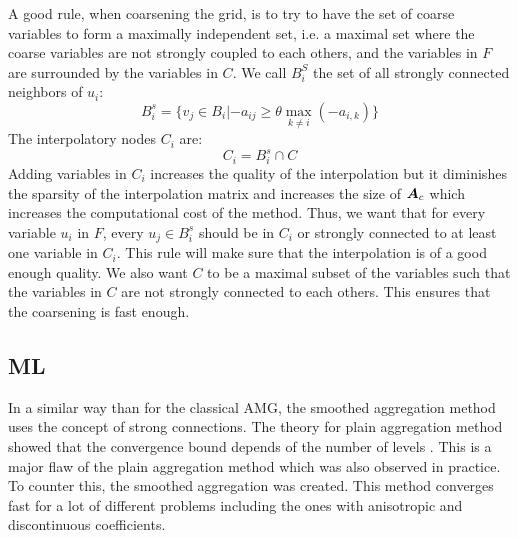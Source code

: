 A good rule, when coarsening the grid, is to try to have the set of coarse 
variables to form a maximally independent set, i.e. a maximal set where the 
coarse variables are not strongly coupled to each others, and the variables 
in $F$ are surrounded by the variables in $C$. We call $B_i^S$ the set of all 
strongly connected neighbors of $u_i$:
\begin{equation}
  B_i^s = \{ v_j \in B_i | -a_{ij} \geq \theta \max_{k\neq i}(-a_{i,k})\}
\end{equation}
The interpolatory nodes $C_i$ are:
\begin{equation}
  C_i = B_i^s \cap C
\end{equation}
Adding variables in $C_i$ increases the quality of the interpolation but
it diminishes the sparsity of the interpolation matrix and increases the
size of $\boldsymbol{A}_c$ which increases the computational cost of the method.
Thus, we want that for every variable $u_i$ in $F$, every $u_j \in B_i^s$
should be in $C_i$ or strongly connected to at least one variable in
$C_i$. This rule will make sure that the interpolation is of a good enough
quality. We also want $C$ to be a maximal subset of the variables such that 
the variables in $C$ are not strongly connected to each others. This ensures 
that the coarsening is fast enough.

\subsection{ML}
In a similar way than for the classical AMG, the smoothed aggregation
method uses the concept of strong connections. The theory for plain
aggregation method showed that the convergence bound depends of the number
of levels \cite{amg_unstruc}. This is a major flaw of the plain aggregation
method which was also observed in practice. To counter this, the smoothed
aggregation was created. This method converges fast for a lot of different 
problems including the ones with anisotropic and discontinuous coefficients.
  
